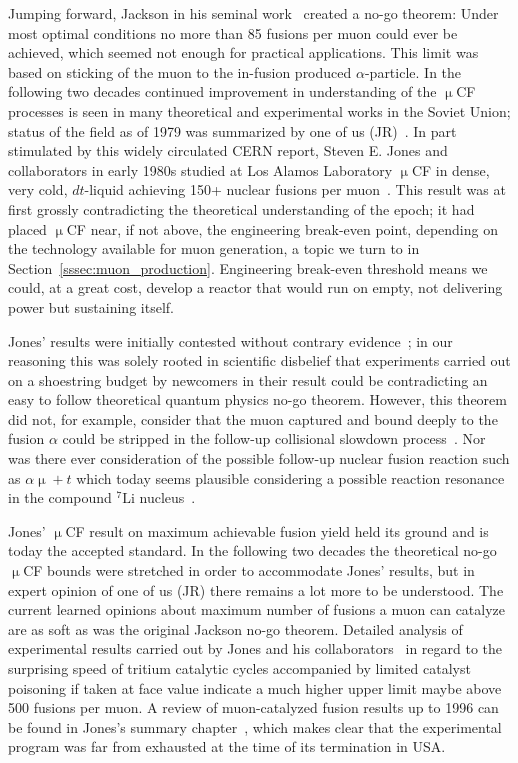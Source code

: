 \documentclass[particles,article,accept,pdftex,moreauthors]{Definitions/mdpi}
\begin{document}
Jumping forward, Jackson in his seminal work~\cite{Jackson:1957zza} created a no-go theorem: Under most optimal conditions no more than 85 fusions per muon could ever be achieved, which seemed not enough for practical applications. This limit was based on sticking of the muon to the in-fusion produced $\alpha$-particle. In the following two decades continued improvement in understanding of the $\upmu$CF processes is seen in many theoretical and experimental works in the Soviet Union; status of the field as of 1979 was summarized by one of us (JR)~\cite{Rafelski:1979ab}. In part stimulated by this widely circulated CERN report, Steven E. Jones and collaborators in early 1980s studied at Los Alamos Laboratory $\upmu$CF in dense, very cold, $dt$-liquid achieving 150+ nuclear fusions per muon~\cite{Jones:1983pw,Jones:1986kk,Jones:1986Na}. This result was at first grossly contradicting the theoretical understanding of the epoch; it had placed $\upmu$CF near, if not above, the engineering break-even point, depending on the technology available for muon generation, a topic we turn to in Section~\ref{sssec:muon_production}. Engineering break-even threshold means we could, at a great cost, develop a reactor that would run on empty, not delivering power but sustaining itself.

Jones' results were initially contested without contrary evidence~\cite{jones1993evaluation}; in our reasoning this was solely rooted in scientific disbelief that experiments carried out on a shoestring budget by newcomers in their result could be contradicting an easy to follow theoretical quantum physics no-go theorem. However, this theorem did not, for example, consider that the muon captured and bound deeply to the fusion $\alpha$ could be stripped in the follow-up collisional slowdown process~\cite{Rafelski:1988wq}. Nor was there ever consideration of the possible follow-up nuclear fusion reaction such as $\alpha\upmu+t$ which today seems plausible considering a possible reaction resonance in the compound ${}^7\mathrm{Li}$ nucleus~\cite{Aprahamian:2025AA}. 

Jones' $\upmu$CF result on maximum achievable fusion yield held its ground and is today the accepted standard. In the following two decades the theoretical no-go $\upmu$CF bounds were stretched in order to accommodate Jones' results, but in expert opinion of one of us (JR) there remains a lot more to be understood. The current learned opinions about maximum number of fusions a muon can catalyze are as soft as was the original Jackson no-go theorem. Detailed analysis of experimental results carried out by Jones and his collaborators~\cite{jones1993evaluation} in regard to the surprising speed of tritium catalytic cycles accompanied by limited catalyst poisoning if taken at face value indicate a much higher upper limit maybe above 500 fusions per muon. A review of muon-catalyzed fusion results up to 1996 can be found in Jones's summary chapter~\cite{Jones1997}, which makes clear that the experimental program was far from exhausted at the time of its termination in USA. 
\end{document}
